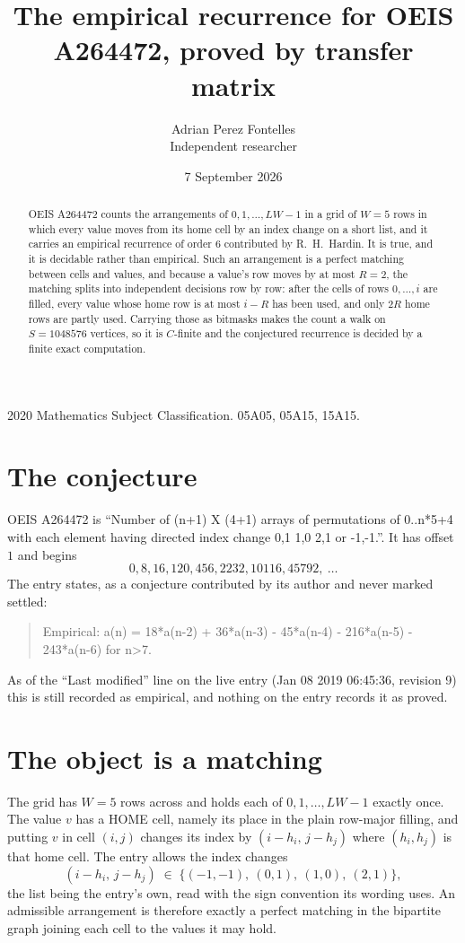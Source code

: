\documentclass[11pt,a4paper]{article}
\title{The empirical recurrence for OEIS A264472, proved by transfer matrix}
\author{Adrian Perez Fontelles\\ \small Independent researcher}
\date{7 September 2026}
\theoremstyle{plain}
\theoremstyle{definition}
\begin{document}
\maketitle

\begin{abstract}
OEIS A264472 counts the arrangements of $0,1,\dots,LW-1$ in a grid of $W=5$ rows in which
every value moves from its home cell by an index change on a short list, and it carries an
empirical recurrence of order $6$ contributed by R.~H.~Hardin. It is true, and it is
decidable rather than empirical. Such an arrangement is a perfect matching between cells and
values, and because a value's row moves by at most $R=2$, the matching splits into
independent decisions row by row: after the cells of rows $0,\dots,i$ are filled,
every value whose home row is at most $i-R$ has been used, and only $2R$ home rows are
partly used. Carrying those as bitmasks makes the count a walk on $S=1048576$ vertices, so it is
$C$-finite and the conjectured recurrence is decided by a finite exact computation.
\end{abstract}

\noindent\small 2020 Mathematics Subject Classification. 05A05, 05A15, 15A15.\normalsize

\section{The conjecture}

OEIS A264472 is ``Number of (n+1) X (4+1) arrays of permutations of 0..n*5+4 with each element having directed index change 0,1 1,0 2,1 or -1,-1.''. It has offset $1$ and begins
\[
0, 8, 16, 120, 456, 2232, 10116, 45792,\ \dots
\]
The entry states, as a conjecture contributed by its author and never marked settled:
\begin{quote}
Empirical: a(n) = 18*a(n-2) + 36*a(n-3) - 45*a(n-4) - 216*a(n-5) - 243*a(n-6) for n>7.
\end{quote}
As of the ``Last modified'' line on the live entry (Jan 08 2019 06:45:36, revision 9) this is still
recorded as empirical, and nothing on the entry records it as proved.

\section{The object is a matching}

The grid has $W=5$ rows across and holds each of $0,1,\dots,LW-1$ exactly once. The value
$v$ has a HOME cell, namely its place in the plain row-major filling, and putting $v$ in cell
$(i,j)$ changes its index by $(i-h_i,\,j-h_j)$ where $(h_i,h_j)$ is that home cell. The entry
allows the index changes
\[
(i-h_i,\,j-h_j)\;\in\;\{(-1,-1),\ (0,1),\ (1,0),\ (2,1)\},
\]
the list being the entry's own, read with the sign convention its wording uses. An admissible
arrangement is therefore exactly a perfect matching in the bipartite graph joining each cell to
the values it may hold.
\end{document}
